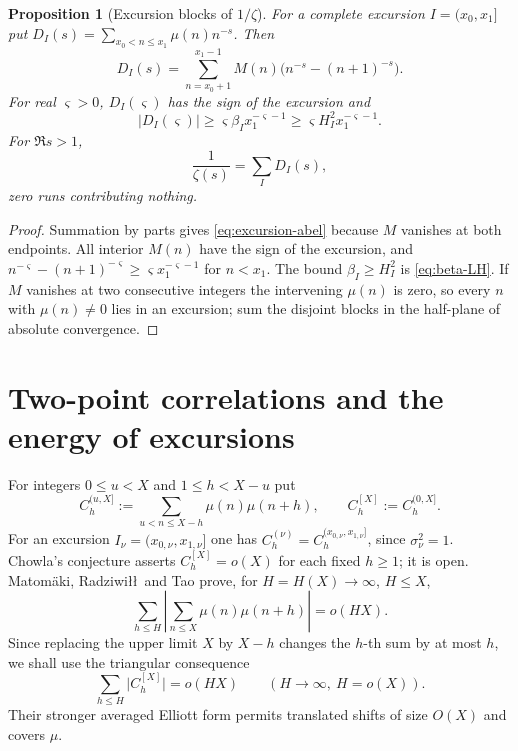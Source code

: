 \documentclass[11pt]{amsart}
\numberwithin{equation}{section}
\theoremstyle{plain}
\newtheorem{proposition}[theorem]{Proposition}
\theoremstyle{definition}
\theoremstyle{remark}
\begin{document}
\begin{proposition}[Excursion blocks of $1/\zeta$]
\label{prop:excursion-mellin}
For a complete excursion $I=(x_0,x_1]$ put
$D_I(s)=\sum_{x_0<n\le x_1}\mu(n)n^{-s}$. Then
\begin{equation}
\label{eq:excursion-abel}
D_I(s)=\sum_{n=x_0+1}^{x_1-1}M(n)
\bigl(n^{-s}-(n+1)^{-s}\bigr).
\end{equation}
For real $\varsigma>0$, $D_I(\varsigma)$ has the sign of the excursion and
\begin{equation}
\label{eq:excursion-mass-lower}
|D_I(\varsigma)|\ge
\varsigma\beta_I x_1^{-\varsigma-1}
\ge\varsigma H_I^2x_1^{-\varsigma-1}.
\end{equation}
For $\Re s>1$,
\begin{equation}
\label{eq:1overzeta-excursions}
\frac1{\zeta(s)}=\sum_I D_I(s),
\end{equation}
zero runs contributing nothing.
\end{proposition}

\begin{proof}
Summation by parts gives \eqref{eq:excursion-abel} because $M$ vanishes at
both endpoints. All interior $M(n)$ have the sign of the excursion, and
$n^{-\varsigma}-(n+1)^{-\varsigma}\ge\varsigma x_1^{-\varsigma-1}$ for $n<x_1$. The
bound $\beta_I\ge H_I^2$ is \eqref{eq:beta-LH}. If $M$ vanishes at two
consecutive integers the intervening $\mu(n)$ is zero, so every $n$ with
$\mu(n)\ne0$ lies in an excursion; sum the disjoint blocks in the
half-plane of absolute convergence.
\end{proof}

\section{Two-point correlations and the energy of excursions}
\label{sec:chowla}

For integers $0\le u<X$ and $1\le h<X-u$ put
\[
C^{(u,X]}_h:=\sum_{u<n\le X-h}\mu(n)\mu(n+h),\qquad
C^{[X]}_h:=C^{(0,X]}_h .
\]
For an excursion $I_\nu=(x_{0,\nu},x_{1,\nu}]$ one has
$C_h^{(\nu)}=C_h^{(x_{0,\nu},x_{1,\nu}]}$, since $\sigma_\nu^2=1$.
Chowla's conjecture asserts $C^{[X]}_h=o(X)$ for each fixed $h\ge1$; it is
open. Matom\"aki, Radziwi\l\l\ and Tao \cite{MRT15} prove, for
$H=H(X)\to\infty$, $H\le X$,
\[
\sum_{h\le H}\left|\sum_{n\le X}\mu(n)\mu(n+h)\right|=o(HX).
\]
Since replacing the upper limit $X$ by $X-h$ changes the $h$-th sum by at
most $h$, we shall use the triangular consequence
\begin{equation}
\label{eq:MRT}
\sum_{h\le H}\bigl|C^{[X]}_h\bigr|=o(HX)
\qquad(H\to\infty,\ H=o(X)).
\end{equation}
Their stronger averaged Elliott form permits translated shifts of size
$O(X)$ and covers $\mu$.
\end{document}
